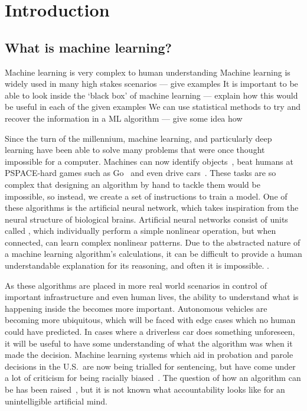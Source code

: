
\chapter{Introduction}

\section{What is machine learning?}
\begin{todo}
    Machine learning is very complex to human understanding
        Machine learning is widely used in many high stakes scenarios --- give examples
        It is important to be able to look inside the `black box' of machine learning --- explain how this would be useful in each of the given examples
        We can use statistical methods to try and recover the information in a ML algorithm --- give some idea how
\end{todo}
   
    

Since the turn of the millennium, machine learning, and particularly deep learning have been able to solve many problems that were once thought impossible for a computer.
Machines can now identify objects~\autocite{li2018}, beat humans at PSPACE-hard games such as Go~\autocite{chao2018} and even drive cars~\autocite{gerla2014}.
These tasks are so complex that designing an algorithm by hand to tackle them would be impossible, so instead, we create a set of instructions to train a model.
One of these  algorithms is the artificial neural network, which takes inspiration from the neural structure of biological brains.
Artificial neural networks consist of units called , which individually perform a simple nonlinear operation, but when connected, can learn complex nonlinear patterns.
Due to the abstracted nature of a machine learning algorithm's calculations, it can be difficult to provide a human understandable explanation for its reasoning, and often it is impossible.
.

As these algorithms are placed in more real world scenarios in control of important infrastructure and even human lives, the ability to understand what is happening inside the  becomes more important.
Autonomous vehicles are becoming more ubiquitous, which will be faced with edge cases which no human could have predicted.
In cases where a driverless car does something unforeseen, it will be useful to have some understanding of what the algorithm was  when it made the decision.
Machine learning systems which aid in probation and parole decisions in the U.S.\ are now being trialled for sentencing, but have come under a lot of criticism for being racially biased~\autocite{christin2015}.
The question of how an algorithm can be  has been raised~\autocite[9]{christin2015}, but it is not known what accountability looks like for an unintelligible artificial mind.
